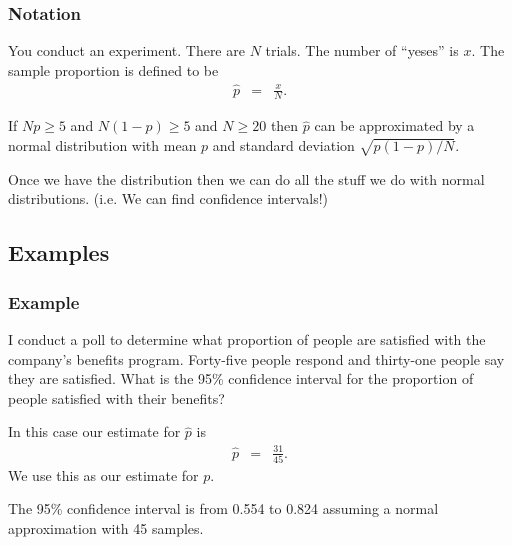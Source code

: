 \begin{frame}
  \frametitle{Notation}


  \begin{definition}

    You conduct an experiment. There are $N$ trials. The number of
    ``yeses'' is $x$.  The sample proportion is defined to be 
    \begin{eqnarray*}
      \hat{p} & = & \frac{x}{N}.
    \end{eqnarray*}

    {

      If $Np\geq 5$ and $N(1-p)\geq 5$ and $N\geq 20$ then $\hat{p}$
      can be approximated by a normal distribution with mean $p$ and
      standard deviation $\sqrt{p(1-p)/N}$.

    }

  \end{definition}

  \vfill

    {

      Once we have the distribution then we can do all the stuff we do
      with normal distributions. (i.e. We can find confidence intervals!)

    }

  
\end{frame}

\subsection{Examples}

\begin{frame}
  \frametitle{Example}

  I conduct a poll to determine what proportion of people are
  satisfied with the company's benefits program. Forty-five people
  respond and thirty-one people say they are satisfied.  What is the
  95\% confidence interval for the proportion of people satisfied with
  their benefits?

  {

    In this case our estimate for $\hat{p}$ is 
    \begin{eqnarray*}
      \hat{p} & = & \frac{31}{45}.
    \end{eqnarray*}
    We use this as our estimate for $p$.

  }

  {

    {\color{red}
      The 95\% confidence interval is from 0.554 to 0.824 assuming a
      normal approximation with 45 samples.
    }

  }
  
\end{frame}


